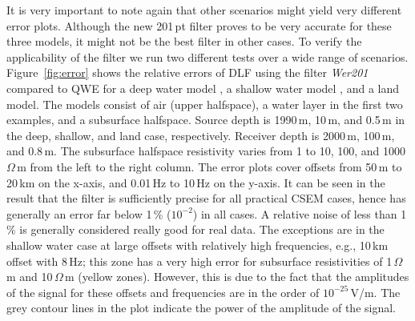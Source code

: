 \documentclass[paper,twocolumn,twoside]{geophysics}
\begin{document}
It is very important to note again that other scenarios might yield very
different error plots. Although the new 201\,pt filter proves to be very
accurate for these three models, it might not be the best filter in other
cases. To verify the applicability of the filter we run two different tests
over a wide range of scenarios. Figure~\ref{fig:error} shows the relative
errors of DLF using the filter \emph{Wer201} compared to QWE for a deep water
model , a shallow water model , and a land model. The models consist of air (upper halfspace), a water
layer in the first two examples, and a subsurface halfspace. Source depth is
1990\,m, 10\,m, and 0.5\,m in the deep, shallow, and land case, respectively.
Receiver depth is 2000\,m, 100\,m, and 0.8\,m. The subsurface halfspace
resistivity varies from 1 to 10, 100, and 1000\,$\Omega\,$m from the left to
the right column. The error plots cover offsets from 50\,m to 20\,km on the
x-axis, and 0.01\,Hz to 10\,Hz on the y-axis. It can be seen in the result that
the filter is sufficiently precise for all practical CSEM cases, hence has
generally an error far below 1\,\% ($10^{-2}$) in all cases. A relative noise
of less than 1\,\% is generally considered really good for real data. The
exceptions are in the shallow water case at large offsets with relatively high
frequencies, e.g., 10\,km offset with 8\,Hz; this zone has a very high error
for subsurface resistivities of 1\,$\Omega\,$m and 10\,$\Omega\,$m (yellow
zones). However, this is due to the fact that the amplitudes of the signal for
these offsets and frequencies are in the order of $10^{-25}\,$V/m. The grey
contour lines in the plot indicate the power of the amplitude of the signal.
%
%
\end{document}

